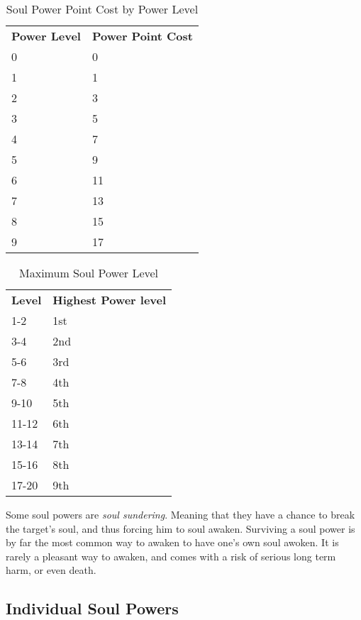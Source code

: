 \begin{table}[!htb]
  \caption{Soul Power Point Cost by Power Level}
  \begin{tabular}{p{2cm} p{3cm}}
    \textbf{Power Level} & \textbf{Power Point Cost} \\
    0 &  0 \\
    1 &  1 \\
    2 &  3 \\
    3 &  5 \\
    4 &  7 \\
    5 &  9 \\
    6 & 11 \\
    7 & 13 \\
    8 & 15 \\
    9 & 17
  \end{tabular}
\end{table}

\begin{table}[!htb]
  \caption{Maximum Soul Power Level}
  \begin{tabular}{p{2cm} p{3cm}}
    \textbf{Level} & \textbf{Highest Power level} \\
    1-2   & 1st \\
    3-4   & 2nd \\
    5-6   & 3rd \\
    7-8   & 4th \\
    9-10  & 5th \\
    11-12 & 6th \\
    13-14 & 7th \\
    15-16 & 8th \\
    17-20 & 9th
  \end{tabular}
\end{table}

Some soul powers are \emph{soul sundering}. Meaning that they have a chance
to break the target's soul, and thus forcing him to soul awaken. Surviving a
soul power is by far the most common way to awaken to have one's own soul
awoken. It is rarely a pleasant way to awaken, and comes with a risk of
serious long term harm, or even death.

\subsection{Individual Soul Powers}

